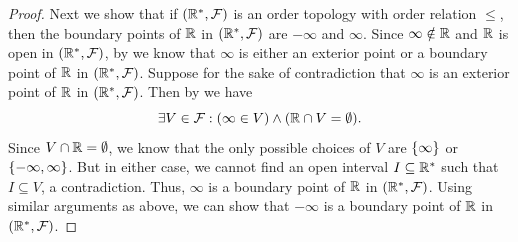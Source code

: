 \begin{proof}
  Next we show that if \((\mathbb{R}^*, \mathcal{F})\) is an order topology with order relation \(\leq\), then the boundary points of \(\mathbb{R}\) in \((\mathbb{R}^*, \mathcal{F})\) are \(-\infty\) and \(\infty\).
  Since \(\infty \notin \mathbb{R}\) and \(\mathbb{R}\) is open in \((\mathbb{R}^*, \mathcal{F})\), by  we know that \(\infty\) is either an exterior point or a boundary point of \(\mathbb{R}\) in \((\mathbb{R}^*, \mathcal{F})\).
  Suppose for the sake of contradiction that \(\infty\) is an exterior point of \(\mathbb{R}\) in \((\mathbb{R}^*, \mathcal{F})\).
  Then by  we have
  \[
    \exists V \in \mathcal{F} : (\infty \in V) \land (\mathbb{R} \cap V = \emptyset).
  \]
  Since \(V \cap \mathbb{R} = \emptyset\), we know that the only possible choices of \(V\) are \(\left\lbrace\infty\right\rbrace\) or \(\left\lbrace-\infty, \infty\right\rbrace\).
  But in either case, we cannot find an open interval \(I \subseteq \mathbb{R}^*\) such that \(I \subseteq V\), a contradiction.
  Thus, \(\infty\) is a boundary point of \(\mathbb{R}\) in \((\mathbb{R}^*, \mathcal{F})\).
  Using similar arguments as above, we can show that \(-\infty\) is a boundary point of \(\mathbb{R}\) in \((\mathbb{R}^*, \mathcal{F})\).


\end{proof}
